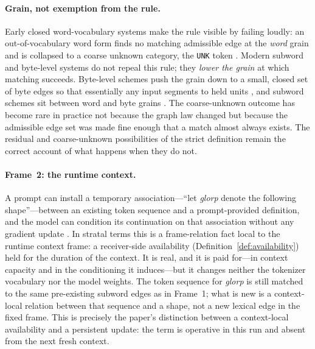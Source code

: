 \documentclass[11pt,a4paper]{article}
\theoremstyle{remark}\newtheorem{remark}[definition]{Remark}
\begin{document}
\paragraph{Grain, not exemption from the rule.} Early closed word-vocabulary
systems make the rule visible by failing loudly: an out-of-vocabulary word form
finds no matching admissible edge at the \emph{word} grain and is collapsed to a
coarse unknown category, the \texttt{UNK} token \citep{luong2015}. Modern subword
and byte-level systems do not repeal this rule; they \emph{lower the grain} at
which matching succeeds. Byte-level schemes push the grain down to a small,
closed set of byte edges so that essentially any input segments to held units
\citep{radford2019}, and subword schemes sit between word and byte grains
\citep{sennrich2016,kudo2018}. The coarse-unknown outcome has become rare in
practice not because the graph law changed but because the admissible edge set was
made fine enough that a match almost always exists. The residual and coarse-unknown
possibilities of the strict definition remain the correct account of what happens
when they do not.

\paragraph{Frame~2: the runtime context.} A prompt can install a temporary
association---``let \emph{glorp} denote the following shape''---between an existing
token sequence and a prompt-provided definition, and the model can condition its
continuation on that association without any gradient update
\citep{brown2020}. In stratal terms this is a frame-relation fact local to the
runtime context frame: a receiver-side availability (Definition~\ref{def:availability})
held for the duration of the context. It is real, and it is paid for---in context
capacity and in the conditioning it induces---but it changes neither the tokenizer
vocabulary nor the model weights. The token sequence for \emph{glorp} is still
matched to the same pre-existing subword edges as in Frame~1; what is new is a
context-local relation between that sequence and a shape, not a new lexical edge in
the fixed frame. This is precisely the paper's distinction between a context-local
availability and a persistent update: the term is operative in this run and absent
from the next fresh context.
\end{document}
